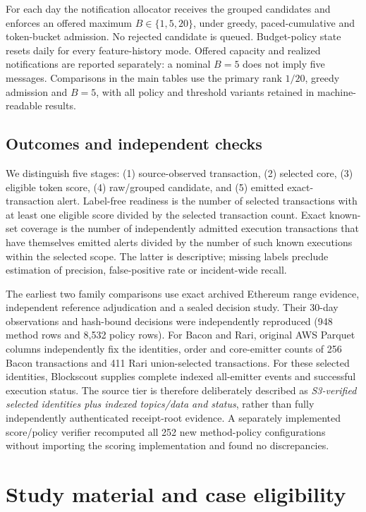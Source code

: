 \documentclass[preprint,12pt,authoryear]{elsarticle}
\begin{document}
For each day the notification allocator receives the grouped candidates and enforces an offered maximum $B\in\{1,5,20\}$, under greedy, paced-cumulative and token-bucket admission. No rejected candidate is queued. Budget-policy state resets daily for every feature-history mode. Offered capacity and realized notifications are reported separately: a nominal $B=5$ does not imply five messages. Comparisons in the main tables use the primary rank $1/20$, greedy admission and $B=5$, with all policy and threshold variants retained in machine-readable results.

\subsection{Outcomes and independent checks}
We distinguish five stages: (1) source-observed transaction, (2) selected core, (3) eligible token score, (4) raw/grouped candidate, and (5) emitted exact-transaction alert. Label-free readiness is the number of selected transactions with at least one eligible score divided by the selected transaction count. Exact known-set coverage is the number of independently admitted execution transactions that have themselves emitted alerts divided by the number of such known executions within the selected scope. The latter is descriptive; missing labels preclude estimation of precision, false-positive rate or incident-wide recall.

The earliest two family comparisons use exact archived Ethereum range evidence, independent reference adjudication and a sealed decision study. Their 30-day observations and hash-bound decisions were independently reproduced (948 method rows and 8,532 policy rows). For Bacon and Rari, original AWS Parquet columns independently fix the identities, order and core-emitter counts of 256 Bacon transactions and 411 Rari union-selected transactions. For these selected identities, Blockscout supplies complete indexed all-emitter events and successful execution status. The source tier is therefore deliberately described as \emph{S3-verified selected identities plus indexed topics/data and status}, rather than fully independently authenticated receipt-root evidence. A separately implemented score/policy verifier recomputed all 252 new method-policy configurations without importing the scoring implementation and found no discrepancies.

\section{Study material and case eligibility}\label{sec:material}
\end{document}
